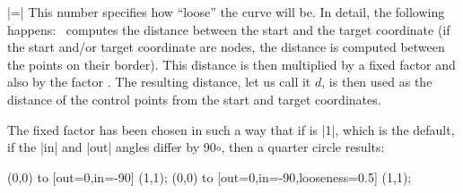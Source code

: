 \begin{itemize}
  |=|
  This number specifies how ``loose'' the curve will be. In detail,
  the following happens: \tikzname\ computes the distance between the
  start and the target coordinate (if the start and/or target
  coordinate are nodes, the distance is computed between the points on
  their border). This distance is then multiplied by a fixed factor
  and also by the factor . The resulting distance, let us
  call it $d$, is then used as the distance of the control points from
  the start and target coordinates.

  The fixed factor has been chosen in such a way that if 
  is |1|, which is the default, if the |in| and |out| angles differ by
  90$\circ$, then a quarter circle results:
  \begin{codeexample}[]
\tikz \draw (0,0) to [out=0,in=-90]               (1,1);
\tikz \draw (0,0) to [out=0,in=-90,looseness=0.5] (1,1);
  \end{codeexample}


\end{itemize}
